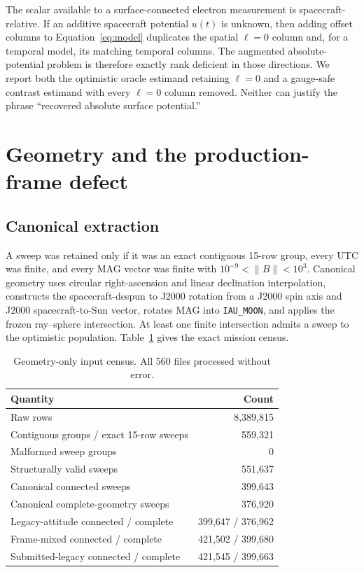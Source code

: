 \documentclass[11pt]{article}
\begin{document}
The scalar available to a surface-connected electron measurement is
spacecraft-relative.  If an additive spacecraft potential $u(t)$ is unknown,
then adding offset columns to Equation~\eqref{eq:model} duplicates the spatial
$\ell=0$ column and, for a temporal model, its matching temporal columns.  The
augmented absolute-potential problem is therefore exactly rank deficient in
those directions.  We report both the optimistic oracle estimand retaining
$\ell=0$ and a gauge-safe contrast estimand with every $\ell=0$ column removed.
Neither can justify the phrase ``recovered absolute surface potential.''

\section{Geometry and the production-frame defect}

\subsection{Canonical extraction}

A sweep was retained only if it was an exact contiguous 15-row group, every UTC
was finite, and every MAG vector was finite with
$10^{-9}<\lVert B\rVert<10^3$.  Canonical geometry uses circular right-ascension
and linear declination interpolation, constructs the spacecraft-despun to
J2000 rotation from a J2000 spin axis and J2000 spacecraft-to-Sun vector,
rotates MAG into \texttt{IAU\_MOON}, and applies the frozen ray--sphere
intersection.  At least one finite intersection admits a sweep to the
optimistic population.  Table~\ref{tab:census} gives the exact mission census.

\begin{table}[ht]
\centering
\caption{Geometry-only input census.  All 560 files processed without error.}
\label{tab:census}
\begin{tabular}{lr}
\toprule
Quantity & Count \\
\midrule
Raw rows & 8,389,815 \\
Contiguous groups / exact 15-row sweeps & 559,321 \\
Malformed sweep groups & 0 \\
Structurally valid sweeps & 551,637 \\
Canonical connected sweeps & 399,643 \\
Canonical complete-geometry sweeps & 376,920 \\
Legacy-attitude connected / complete & 399,647 / 376,962 \\
Frame-mixed connected / complete & 421,502 / 399,680 \\
Submitted-legacy connected / complete & 421,545 / 399,663 \\
\bottomrule
\end{tabular}
\end{table}
\end{document}
